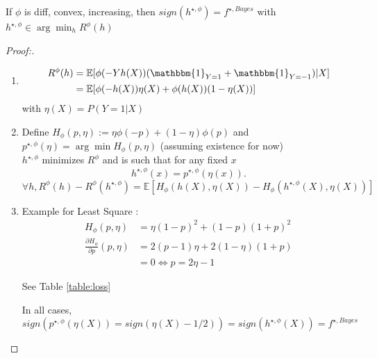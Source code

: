 \begin{lem}[]
    If $ \phi  $ is diff, convex, increasing, then $ sign(h^{\star, \phi }) = f^{\star, Bayes} $ with $ h^{\star, \phi }  \in  \arg \min_h R^\phi (h)$ 
\end{lem}
\begin{proof}[Proof:]
    \begin{enumerate}
        \item \begin{align*}
            R^\phi (h) &= \mathbb{E}[\phi (-Yh(X))(\mathbbm{1}_{Y=1} + \mathbbm{1}_{Y = -1}) | X] \\ 
                &= \mathbb{E}[\phi (-h(X)) \eta (X) + \phi (h(X)) (1 - \eta (X))]
        \end{align*}
        with $ \eta (X) = P(Y=1 | X) $
        
        \item Define $ H_\phi (p, \eta ) := \eta \phi (-p) + (1 - \eta ) \phi (p) $ and $ p^{\star , \phi }(\eta ) = \arg \min H_\phi (p, \eta ) $ (assuming existence for now) \\
        $ h^{\star , \phi }  $ minimizes $ R^\phi  $  and is such that for any fixed $ x $ 
        \[
            h^{\star , \phi }(x) = p^{\star , \phi }(\eta (x))
        .\]
        $ \forall h, R^\phi (h) - R^\phi (h^{\star , \phi }) = \mathbb{E}[H_\phi (h(X), \eta (X)) - H_\phi (h^{\star , \phi }(X), \eta (X))] $ 
        
        \item Example for Least Square : \begin{align*}
            H_\phi (p, \eta ) &= \eta (1 - p)^2 + (1 - p)(1 + p)^2 \\
            \frac{\partial H_\phi }{\partial p} (p , \eta ) &= 2 (p -1) \eta + 2(1 - \eta )(1+p) \\
                    &= 0 \Leftrightarrow p = 2 \eta - 1
        \end{align*} 


        See Table \ref*{table:loss}
        
        In all cases, $ sign(p^{\star , \phi }(\eta (X)) = sign(\eta (X) - 1/2)) = sign(h^{\star , \phi }(X)) = f^{\star , Bayes}$ 


\end{enumerate}
\end{proof}

